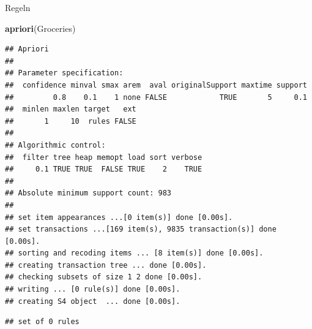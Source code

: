 \documentclass[12pt,ngerman,a4paper,ignorenonframetext,]{beamer}
\newenvironment{Shaded}{\begin{snugshade}}{\end{snugshade}}
\newcommand{\KeywordTok}[1]{\textcolor[rgb]{0.13,0.29,0.53}{\textbf{#1}}}
\newcommand{\NormalTok}[1]{#1}
\begin{document}
\begin{frame}{Regeln}
\protect\hypertarget{regeln}{}

\begin{Shaded}
\begin{Highlighting}[]
\KeywordTok{apriori}\NormalTok{(Groceries)}
\end{Highlighting}
\end{Shaded}

\begin{verbatim}
## Apriori
## 
## Parameter specification:
##  confidence minval smax arem  aval originalSupport maxtime support
##         0.8    0.1    1 none FALSE            TRUE       5     0.1
##  minlen maxlen target   ext
##       1     10  rules FALSE
## 
## Algorithmic control:
##  filter tree heap memopt load sort verbose
##     0.1 TRUE TRUE  FALSE TRUE    2    TRUE
## 
## Absolute minimum support count: 983 
## 
## set item appearances ...[0 item(s)] done [0.00s].
## set transactions ...[169 item(s), 9835 transaction(s)] done [0.00s].
## sorting and recoding items ... [8 item(s)] done [0.00s].
## creating transaction tree ... done [0.00s].
## checking subsets of size 1 2 done [0.00s].
## writing ... [0 rule(s)] done [0.00s].
## creating S4 object  ... done [0.00s].
\end{verbatim}

\begin{verbatim}
## set of 0 rules
\end{verbatim}

\end{frame}
\end{document}
